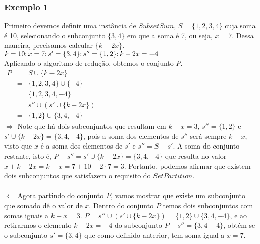 \documentclass[12pt]{article}
\begin{document}
\subsubsection{Exemplo 1} 
Primeiro devemos definir uma instância de $SubsetSum$,  $S = \{1,2,3,4\}$ cuja soma é 10, selecionando o subconjunto $\{3,4\}$ em que a soma é 7, ou seja, $x = 7$. Dessa maneira, precisamos calcular $\{k-2x\}$.\\
$k = 10;\\ x = 7;\\ s' = \{3,4\};\\ s'' = \{1,2\};\\ k - 2x = -4$
\\
Aplicando o algoritmo de redução, obtemos o conjunto $P$.
\\
$\begin{matrix}
P &=& S \cup \{k-2x\}\\
\ &=& \{1,2,3,4\} \cup \{-4\}\\
\ &=& \{1,2,3,4,-4\}\\
\ &=& s'' \cup (s' \cup \{k-2x\})\\
\ &=& \{1,2\} \cup \{3,4,-4\}
\end{matrix}$
\\
\textbf{$\Rightarrow$} Note que há dois subconjuntos que resultam em $k - x  = 3$, $s'' = \{1,2\}$ e $s' \cup \{k - 2x\} = \{3,4,-4\}$, pois a soma dos elementos de $s''$ será sempre $k - x$, visto que $x$ é a soma dos elementos de $s'$ e $s'' = S - s'$. A soma do conjunto restante, isto é, $P - s'' = s' \cup \{k-2x\} = \{3,4,-4\}$ que resulta no valor $x + k - 2x = k -x = 7 + 10 - 2\cdot7 = 3$. Portanto, podemos afirmar que existem dois subconjuntos que satisfazem o requisito do $SetPartition$.\\
\\
\textbf{$\Leftarrow$} Agora partindo do conjunto $P$, vamos mostrar que existe um subconjunto que somado dê o valor de $x$. Dentro do conjunto $P$ temos dois subconjuntos com somas iguais a $k - x = 3$. $P = s'' \cup (s' \cup \{k - 2x\}) = \{1,2\} \cup \{3,4,-4\}$, e ao retirarmos o elemento $k - 2x = - 4$ do subconjunto $P - s'' = \{3,4-4\}$, obtém-se o subconjunto $s' = \{3,4\}$ que como definido anterior, tem soma igual a $x = 7$.
\\
\end{document}
